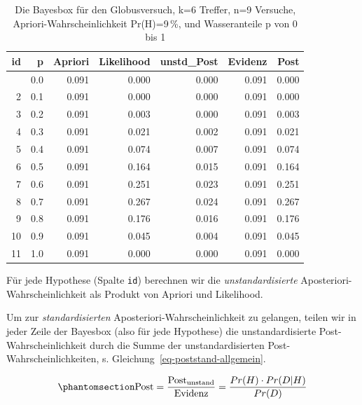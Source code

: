 \documentclass[
  ngerman,
  letterpaper,
  twoside,
  open=any]{scrbook}
\theoremstyle{definition}
\theoremstyle{plain}
\theoremstyle{definition}
\theoremstyle{definition}
\theoremstyle{definition}
\theoremstyle{definition}
\theoremstyle{remark}
\begin{document}
{

\begin{longtable}[]{@{}rrrrrrr@{}}

\caption{\label{tbl-globus}Die Bayesbox für den Globusversuch, k=6
Treffer, n=9 Versuche, Apriori-Wahrscheinlichkeit Pr(H)=9\,\%, und
Wasseranteile p von 0 bis 1}

\tabularnewline

\toprule\noalign{}
id & p & Apriori & Likelihood & unstd\_Post & Evidenz & Post \\
\midrule\noalign{}
\endhead
\bottomrule\noalign{}
\endlastfoot
1 & 0.0 & 0.091 & 0.000 & 0.000 & 0.091 & 0.000 \\
2 & 0.1 & 0.091 & 0.000 & 0.000 & 0.091 & 0.000 \\
3 & 0.2 & 0.091 & 0.003 & 0.000 & 0.091 & 0.003 \\
4 & 0.3 & 0.091 & 0.021 & 0.002 & 0.091 & 0.021 \\
5 & 0.4 & 0.091 & 0.074 & 0.007 & 0.091 & 0.074 \\
6 & 0.5 & 0.091 & 0.164 & 0.015 & 0.091 & 0.164 \\
7 & 0.6 & 0.091 & 0.251 & 0.023 & 0.091 & 0.251 \\
8 & 0.7 & 0.091 & 0.267 & 0.024 & 0.091 & 0.267 \\
9 & 0.8 & 0.091 & 0.176 & 0.016 & 0.091 & 0.176 \\
10 & 0.9 & 0.091 & 0.045 & 0.004 & 0.091 & 0.045 \\
11 & 1.0 & 0.091 & 0.000 & 0.000 & 0.091 & 0.000 \\

\end{longtable}

}

Für jede Hypothese (Spalte \texttt{id}) berechnen wir die
\emph{unstandardisierte} Aposteriori-Wahrscheinlichkeit als Produkt von
Apriori und Likelihood.

Um zur \emph{standardisierten} Aposteriori-Wahrscheinlichkeit zu
gelangen, teilen wir in jeder Zeile der Bayesbox (also für jede
Hypothese) die unstandardisierte Post-Wahrscheinlichkeit durch die Summe
der unstandardisierten Post-Wahrscheinlichkeiten, s.
Gleichung~\ref{eq-poststand-allgemein}.

\begin{equation}\protect\phantomsection\label{eq-poststand-allgemein}{\text{Post} = \frac{\text{Post}_{\text{unstand}}}{\text{Evidenz}} = \frac{Pr(H) \cdot Pr(D|H)}{Pr(D)}}\end{equation}
\end{document}

